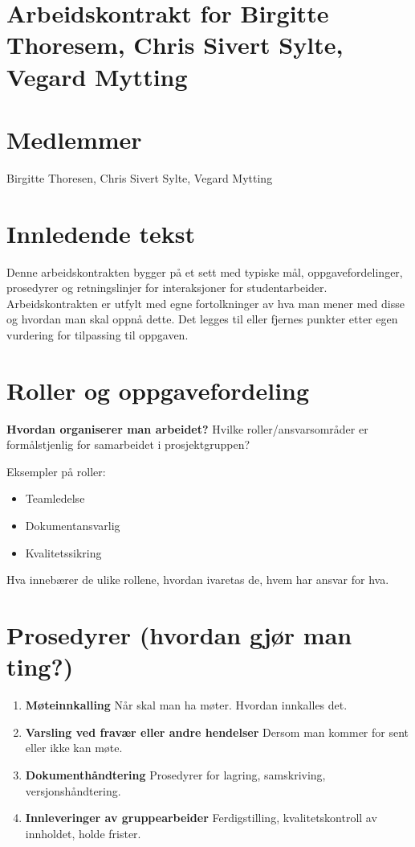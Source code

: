 \section{Arbeidskontrakt for Birgitte Thoresem, Chris Sivert Sylte, Vegard Mytting}

\section*{Medlemmer}
Birgitte Thoresen, Chris Sivert Sylte, Vegard Mytting

\section*{Innledende tekst}
Denne arbeidskontrakten bygger på et sett med typiske mål, oppgavefordelinger, prosedyrer og retningslinjer for interaksjoner for studentarbeider. Arbeidskontrakten er utfylt med egne fortolkninger av hva man mener med disse og hvordan man skal oppnå dette.  
Det legges til eller fjernes punkter etter egen vurdering for tilpassing til oppgaven.

\section*{Roller og oppgavefordeling}
\textbf{Hvordan organiserer man arbeidet?}  
Hvilke roller/ansvarsområder er formålstjenlig for samarbeidet i prosjektgruppen?  

Eksempler på roller:  
\begin{itemize}
    \item Teamledelse
    \item Dokumentansvarlig
    \item Kvalitetssikring
\end{itemize}

Hva innebærer de ulike rollene, hvordan ivaretas de, hvem har ansvar for hva.

\section*{Prosedyrer (hvordan gjør man ting?)}
\begin{enumerate}[label=\Alph*.]
    \item \textbf{Møteinnkalling}  
    Når skal man ha møter. Hvordan innkalles det.

    \item \textbf{Varsling ved fravær eller andre hendelser}  
    Dersom man kommer for sent eller ikke kan møte.

    \item \textbf{Dokumenthåndtering}  
    Prosedyrer for lagring, samskriving, versjonshåndtering.

    \item \textbf{Innleveringer av gruppearbeider}  
    Ferdigstilling, kvalitetskontroll av innholdet, holde frister.
\end{enumerate}

